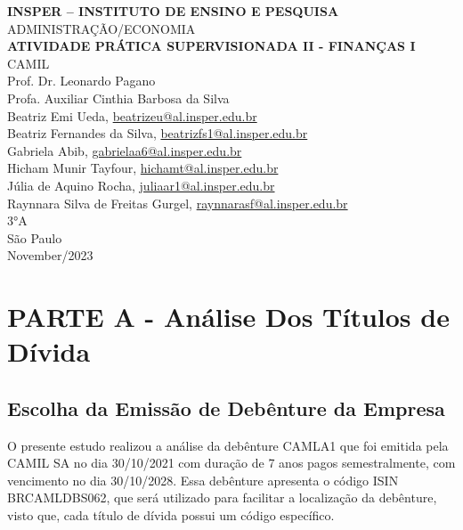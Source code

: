 \documentclass[11pt]{article}
\begin{document}
\begin{titlepage}
    \centering
    \vspace*{1cm}
    \Large\textbf{INSPER – INSTITUTO DE ENSINO E PESQUISA}\\
    \Large ADMINISTRAÇÃO/ECONOMIA\\
    \vspace{1.5cm}
    \Large\textbf{ATIVIDADE PRÁTICA SUPERVISIONADA II - FINANÇAS I}\\
    \vspace{1.5cm}
    \large CAMIL\\
    Prof. Dr. Leonardo Pagano\\
    Profa. Auxiliar Cinthia Barbosa da Silva\\
    \vfill
    \normalsize
    Beatriz Emi Ueda, \href{mailto:beatrizeu@al.insper.edu.br}{beatrizeu@al.insper.edu.br}\\
    Beatriz Fernandes da Silva, \href{mailto:beatrizfs1@al.insper.edu.br}{beatrizfs1@al.insper.edu.br}\\
    Gabriela Abib, \href{mailto:gabrielaa6@al.insper.edu.br}{gabrielaa6@al.insper.edu.br}\\
    Hicham Munir Tayfour, \href{mailto:hichamt@al.insper.edu.br}{hichamt@al.insper.edu.br}\\
    Júlia de Aquino Rocha, \href{mailto:juliaar1@al.insper.edu.br}{juliaar1@al.insper.edu.br}\\
    Raynnara Silva de Freitas Gurgel, \href{mailto:raynnarasf@al.insper.edu.br}{raynnarasf@al.insper.edu.br}\\
    3°A\\
    \vfill
    São Paulo\\
    November/2023
\end{titlepage}

\newpage
\tableofcontents
\thispagestyle{empty} %
\newpage
\setcounter{page}{1} %
\justify
\onehalfspacing

\pagestyle{fancy}
\fancyhf{}
\rhead{\thepage}

\section{\textbf{PARTE A - Análise Dos Títulos de Dívida}}
\subsection{\textbf{Escolha da Emissão de Debênture da Empresa}}
O presente estudo realizou a análise da debênture CAMLA1 que foi emitida pela CAMIL SA no dia 30/10/2021 com duração de 7 anos pagos semestralmente, com vencimento no dia 30/10/2028. Essa debênture apresenta o código ISIN BRCAMLDBS062, que será utilizado para facilitar a localização da debênture, visto que, cada título de dívida possui um código específico.
\end{document}
